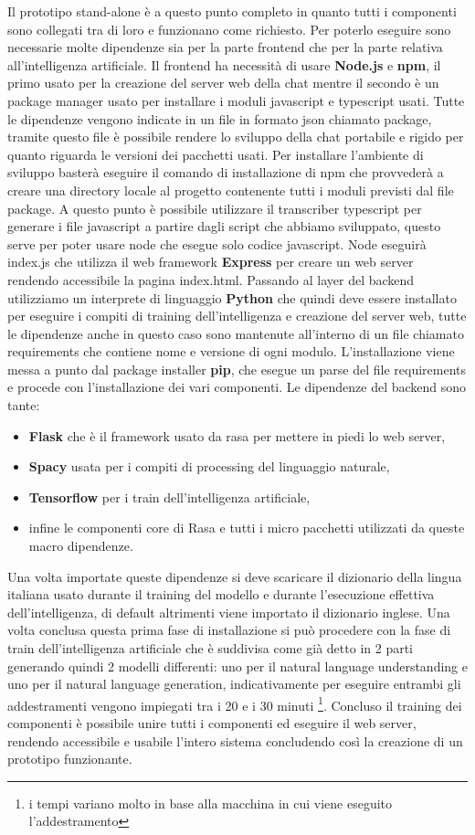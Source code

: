 Il prototipo stand-alone è a questo punto completo in quanto tutti i componenti sono collegati tra di loro e funzionano come richiesto. Per poterlo eseguire sono necessarie molte dipendenze sia per la parte frontend che per la parte relativa all'intelligenza artificiale.
Il frontend ha necessità di usare \textbf{Node.js} e \textbf{npm}, il primo usato per la creazione del server web della chat mentre il secondo è un package manager usato per installare i moduli javascript e typescript usati.
Tutte le dipendenze vengono indicate in un file in formato json chiamato package, tramite questo file è possibile rendere lo sviluppo della chat portabile e rigido per quanto riguarda le versioni dei pacchetti usati. Per installare l'ambiente di sviluppo basterà eseguire il comando di installazione di npm che provvederà a creare una directory locale al progetto contenente tutti i moduli previsti dal file package.
A questo punto è possibile utilizzare il transcriber typescript per generare i file javascript a partire dagli script che abbiamo sviluppato, questo serve per poter usare node che esegue solo codice javascript.
Node eseguirà index.js che utilizza il web framework \textbf{Express} per creare un web server rendendo accessibile la pagina index.html.
Passando al layer del backend utilizziamo un interprete di linguaggio \textbf{Python} che quindi deve essere installato per eseguire i compiti di training dell'intelligenza e creazione del server web, tutte le dipendenze anche in questo caso sono mantenute all'interno di un file chiamato requirements che contiene nome e versione di ogni modulo. L'installazione viene messa a punto dal package installer \textbf{pip}, che esegue un parse del file requirements e procede con l'installazione dei vari componenti.
Le dipendenze del backend sono tante: 
\begin{itemize}
    \item \textbf{Flask} che è il framework usato da rasa per mettere in piedi lo web server, 
    \item \textbf{Spacy} usata per i compiti di processing del linguaggio naturale, 
    \item \textbf{Tensorflow} per i train dell'intelligenza artificiale, 
    \item infine le componenti core di Rasa e tutti i micro pacchetti utilizzati da queste macro dipendenze.
\end{itemize}
Una volta importate queste dipendenze si deve scaricare il dizionario della lingua italiana usato durante il training del modello e durante l'esecuzione effettiva dell'intelligenza, di default altrimenti viene importato il dizionario inglese.
Una volta conclusa questa prima fase di installazione si può procedere con la fase di train dell'intelligenza artificiale che è suddivisa come già detto in 2 parti generando quindi 2 modelli differenti: uno per il natural language understanding e uno per il natural language generation, indicativamente per eseguire entrambi gli addestramenti vengono impiegati tra i 20 e i 30 minuti \footnote{i tempi variano molto in base alla macchina in cui viene eseguito l'addestramento}.
Concluso il training dei componenti è possibile unire tutti i componenti ed eseguire il web server, rendendo accessibile e usabile l'intero sistema concludendo così la creazione di un prototipo funzionante.

